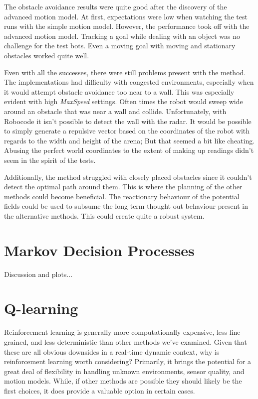 \documentclass{aiaa-tc}%
\begin{document}
The obstacle avoidance results were quite good after the discovery of the advanced motion model. At first, expectations were low when watching the test runs with the simple motion model. However, the performance took off with the advanced motion model. Tracking a goal while dealing with an object was no challenge for the test bots. Even a moving goal with moving and stationary obstacles worked quite well.

Even with all the successes, there were still problems present with the method. The implementations had difficulty with congested environments, especially when it would attempt obstacle avoidance too near to a wall. This was especially evident with high \emph{MaxSpeed} settings. Often times the robot would sweep wide around an obstacle that was near a wall and collide. Unfortunately, with Robocode it isn't possible to detect the wall with the radar. It would be possible to simply generate a repulsive vector based on the coordinates of the robot with regards to the width and height of the arena; But that seemed a bit like cheating. Abusing the perfect world coordinates to the extent of making up readings didn't seem in the spirit of the tests.

Additionally, the method struggled with closely placed obstacles since it couldn't detect the optimal path around them. This is where the planning of the other methods could become beneficial. The reactionary behaviour of the potential fields could be used to subsume the long term thought out behaviour present in the alternative methods. This could create quite a robust system.

\section{Markov Decision Processes}
\label{Markov Decision Processes}
Discussion and plots...

\section{Q-learning}
\label{Q-learning}

Reinforcement learning is generally more computationally expensive,
less fine-grained, and less deterministic than other methods we've
examined. Given that these are all obvious downsides in a
real-time dynamic context, why is reinforcement learning worth
considering? Primarily, it brings the potential for a great deal of
flexibility in handling unknown environments, sensor quality, and
motion models. While, if other methods are possible they should likely
be the first choices, it does provide a valuable option in certain
cases.
\end{document}
